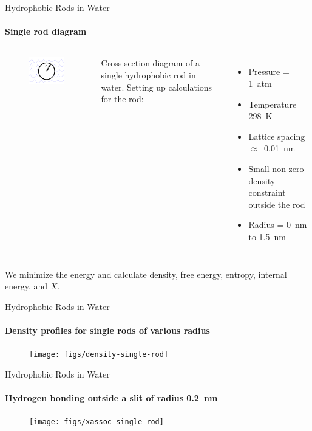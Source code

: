 \documentclass{beamer}
\begin{document}
\begin{frame}{Hydrophobic Rods in Water}
\framesubtitle{Single rod diagram}
\begin{columns}
  \begin{figure}
  \begin{center}
  \includegraphics[width=4.5cm]{figs/single-rod-diagram}
  \end{center}
  \end{figure}
  Cross section diagram of a single hydrophobic rod in water.
  Setting up calculations for the rod:
  \begin{itemize}
  \item Pressure = 1~atm
  \item Temperature = 298~K
  \item Lattice spacing $\approx$~0.01~nm 
  \item Small non-zero density constraint outside the rod
  \item Radius = 0~nm to 1.5~nm
  \end{itemize}
\end{columns}
\vspace{0.5cm}
We minimize the energy and calculate density, free energy, entropy, 
internal energy, and $X$.
\end{frame}

\begin{frame}[fragile]{Hydrophobic Rods in Water}
\framesubtitle{Density profiles for single rods of various radius}
\begin{figure}
\begin{center}
\texttt{[image: figs/density-single-rod]}
\end{center}
\end{figure}
\end{frame}

\begin{frame}[fragile]{Hydrophobic Rods in Water}
\framesubtitle{Hydrogen bonding outside a slit of radius 0.2~nm}
\begin{figure}
\begin{center}
\texttt{[image: figs/xassoc-single-rod]}
\end{center}
\end{figure} 
\end{frame}
\end{document}
